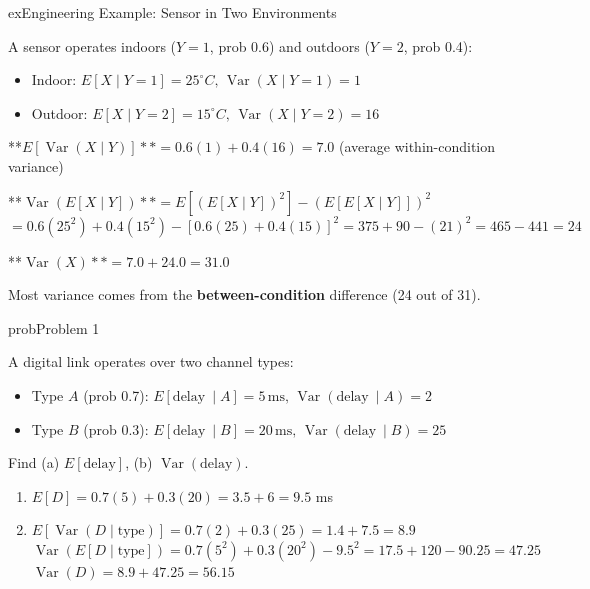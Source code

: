 \begin{PSbox}[unbreakable]{ex}{Engineering Example: Sensor in Two Environments}

A sensor operates indoors ($Y = 1$, prob 0.6) and outdoors ($Y = 2$, prob 0.4):

\begin{itemize}
\tightlist
\item
  Indoor: $E[X \mid Y = 1] = 25^{\circ}C,\, \operatorname{Var}(X \mid Y = 1) = 1$
\item
  Outdoor: $E[X \mid Y = 2] = 15^{\circ}C,\, \operatorname{Var}(X \mid Y = 2) = 16$
\end{itemize}

**$E[\operatorname{Var}(X \mid Y)] \ast \ast = 0.6(1) + 0.4(16) = 7.0$ (average within-condition variance)

**$\operatorname{Var}(E[X \mid Y]) \ast \ast = E[(E[X \mid Y])^{2}] - (E[E[X \mid Y]])^{2}$\PSbr{}$= 0.6(25^{2}) + 0.4(15^{2}) - [0.6(25) + 0.4(15)]^{2} = 375 + 90 - (21)^{2} = 465 - 441 = 24$

**$\operatorname{Var}(X) \ast \ast = 7.0 + 24.0 = 31.0$

Most variance comes from the \textbf{between-condition} difference (24 out of 31).

\end{PSbox}


\begin{PSbox}[unbreakable]{prob}{Problem 1}

A digital link operates over two channel types:

\begin{itemize}
\tightlist
\item
  Type $A$ (prob 0.7): $E[\text{delay}\ \mid A] = 5\,\mathrm{ms},\, \operatorname{Var}(\text{delay}\ \mid A) = 2$
\item
  Type $B$ (prob 0.3): $E[\text{delay}\ \mid B] = 20\,\mathrm{ms},\, \operatorname{Var}(\text{delay}\ \mid B) = 25$
\end{itemize}

Find (a) $E[\text{delay}]$, (b) $\operatorname{Var}(\text{delay})$.

\PSsolution{} 

\begin{enumerate}
\def\labelenumi{(\alph{enumi})}
\tightlist
\item
  $E[D] = 0.7(5) + 0.3(20) = 3.5 + 6 = 9.5$ ms
\item
  $E[\operatorname{Var}(D \mid \text{type})] = 0.7(2) + 0.3(25) = 1.4 + 7.5 = 8.9$\PSbr{}$\operatorname{Var}(E[D \mid \text{type}]) = 0.7(5^{2}) + 0.3(20^{2}) - 9.5^{2} = 17.5 + 120 - 90.25 = 47.25$\PSbr{}$\operatorname{Var}(D) = 8.9 + 47.25 = 56.15$
\end{enumerate}

\end{PSbox}

